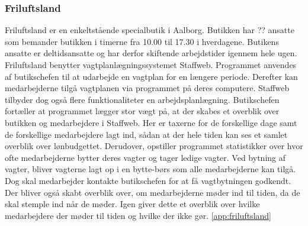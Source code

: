 \subsubsection{Friluftsland}
Friluftsland er en enkeltstående specialbutik i Aalborg. Butikken har ?? ansatte som bemander butikken i timerne fra 10.00 til 17.30 i hverdagene. Butikens ansatte er deltidsansatte og har derfor skiftende arbejdstider igennem hele ugen. Friluftsland benytter vagtplanlægningssystemet Staffweb. Programmet anvendes af butikschefen til at udarbejde en vagtplan for en længere periode. Derefter kan medarbejderne tilgå vagtplanen via programmet på deres computere. Staffweb tilbyder dog også flere funktionaliteter en arbejdsplanlægning. Butikschefen fortæller at programmet lægger stor vægt på, at der skabes et overblik over butikken og medarbejdere i Staffweb. Her er taxerne for de forskellige dage samt de forskellige medarbejdere lagt ind, sådan at der hele tiden kan ses et samlet overblik over lønbudgettet. Derudover, opstiller programmet statistikker over hvor ofte medarbejderne bytter deres vagter og tager ledige vagter. Ved bytning af vagter, bliver vagterne lagt op i en bytte-børs som alle medarbejderne kan tilgå. Dog skal medarbejder kontakte butikschefen for at få vagtbytningen godkendt. Der bliver også skabt overblik over, om medarbejderne møder ind til tiden, da de skal stemple ind når de møder. Igen giver dette et overblik over hvilke medarbejdere der møder til tiden og hvilke der ikke gør. \ref{app:friluftsland}

